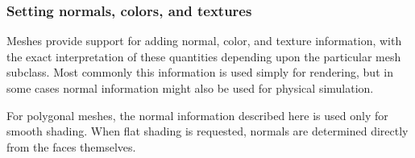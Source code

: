 \subsubsection{Setting normals, colors, and textures}

Meshes provide support for adding normal, color, and texture
information, with the exact interpretation of these quantities
depending upon the particular mesh subclass. Most commonly this
information is used simply for rendering, but in some cases normal
information might also be used for physical simulation.

\begin{sideblock}
For polygonal meshes, the normal information described here is used
only for smooth shading. When flat shading is requested, normals are
determined directly from the faces themselves.
\end{sideblock}

